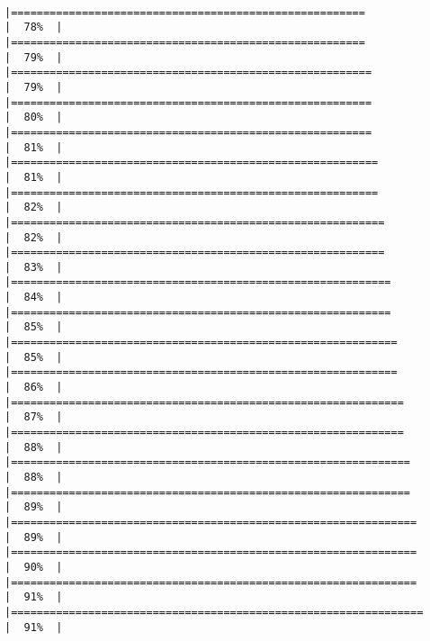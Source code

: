 \documentclass[12pt,twoside]{reedthesis}
\begin{document}
\begin{verbatim}
                                                                       |=======================================================               |  78%  |                                                                              |=======================================================               |  79%  |                                                                              |========================================================              |  79%  |                                                                              |========================================================              |  80%  |                                                                              |========================================================              |  81%  |                                                                              |=========================================================             |  81%  |                                                                              |=========================================================             |  82%  |                                                                              |==========================================================            |  82%  |                                                                              |==========================================================            |  83%  |                                                                              |===========================================================           |  84%  |                                                                              |===========================================================           |  85%  |                                                                              |============================================================          |  85%  |                                                                              |============================================================          |  86%  |                                                                              |=============================================================         |  87%  |                                                                              |=============================================================         |  88%  |                                                                              |==============================================================        |  88%  |                                                                              |==============================================================        |  89%  |                                                                              |===============================================================       |  89%  |                                                                              |===============================================================       |  90%  |                                                                              |===============================================================       |  91%  |                                                                              |================================================================      |  91%  |        
\end{verbatim}
\end{document}
